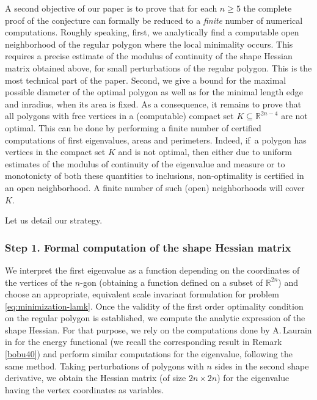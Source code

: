 \documentclass[11pt]{article}
\numberwithin{equation}{section}\newtheorem*{jepEnonce}{\jepEnonceTitle}\newenvironment{enonce*}[1]{\def\jepEnonceTitle{#1}\jepEnonce}{\endjepEnonce}\newtheorem*{conj*}{Conjecture}
\theoremstyle{plain}
\theoremstyle{definition}
\def\R{\mathbb{R}}
\newcommand{\sq}{\subseteq}
\begin{document}
A second objective of our paper is to prove that for each $n \ge 5$ the complete proof of the conjecture can formally be reduced to a {\it finite} number of numerical computations. Roughly speaking, first, we analytically
find a computable open neighborhood of the regular polygon where the {local} minimality occurs. This requires a precise estimate of the modulus of continuity of the shape Hessian matrix obtained above, for small perturbations of the regular polygon. This is the most technical part of the paper. Second, we give a bound for the maximal possible diameter of the optimal polygon as well as for the minimal length edge and inradius, when its area is fixed. As a consequence, {it remains} to prove that all polygons with free vertices in a (computable) compact set $K \sq \R^{2n-4}$ are not optimal. This can be done by performing a finite number of certified computations of first eigenvalues, areas and perimeters. Indeed, if~a polygon has vertices in the compact set $K$ and is not optimal, then either due to uniform estimates of the modulus of continuity of the eigenvalue and measure or to monotonicty of both these quantities to inclusions, non-optimality is certified in an open neighborhood. A finite number of such (open) neighborhoods will cover $K$. 

Let us detail our strategy.

\subsubsection*{Step 1. Formal computation of the shape Hessian matrix}
We interpret the first eigenvalue as a function depending on the coordinates of the vertices of the $n$-gon (obtaining a function defined on a subset of $\R^{2n}$) and choose an appropriate, equivalent scale invariant formulation for problem \eqref{eq:minimization-lamk}. Once the validity of the first order optimality condition on the regular polygon is established, we compute the analytic expression of the shape Hessian. For that purpose, we rely on the computations done by A.\,Laurain in \cite{laurain2ndDeriv} for the energy functional (we recall the corresponding result in Remark \ref{bobu40}) and perform similar computations for the eigenvalue, following the same method.
Taking perturbations of
polygons with $n$ sides in the second shape derivative, we obtain the Hessian matrix (of size $2n\times 2n$) for the eigenvalue having the vertex coordinates as variables.
\end{document}
